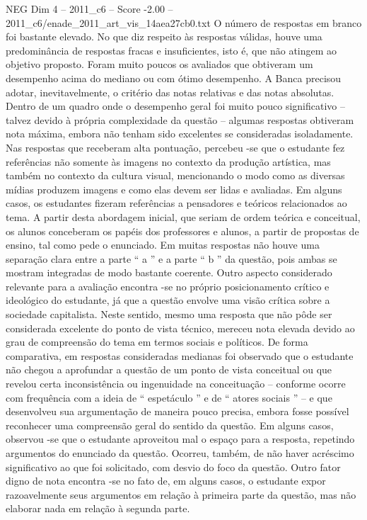 \begin{textsample}{NEG Dim 4 – 2011\_c6 – Score -2.00 – 2011\_c6/enade\_2011\_art\_vis\_14aea27cb0.txt}
O número de respostas em branco foi bastante elevado.
No que diz respeito às respostas válidas, houve uma predominância de respostas fracas e insuficientes, isto é, que não atingem ao objetivo proposto.
Foram muito poucos os avaliados que obtiveram um desempenho acima do mediano ou com ótimo desempenho.
A Banca precisou adotar, inevitavelmente, o critério das notas relativas e das notas absolutas.
Dentro de um quadro onde o desempenho geral foi muito pouco significativo – talvez devido à própria complexidade da questão – algumas respostas obtiveram nota máxima, embora não tenham sido excelentes se consideradas isoladamente.
Nas respostas que receberam alta pontuação, percebeu -se que o estudante fez referências não somente às imagens no contexto da produção artística, mas também no contexto da cultura visual, mencionando o modo como as diversas mídias produzem imagens e como elas devem ser lidas e avaliadas.
Em alguns casos, os estudantes fizeram referências a pensadores e teóricos relacionados ao tema.
A partir desta abordagem inicial, que seriam de ordem teórica e conceitual, os alunos conceberam os papéis dos professores e alunos, a partir de propostas de ensino, tal como pede o enunciado.
Em muitas respostas não houve uma separação clara entre a parte “ a ” e a parte “ b ” da questão, pois ambas se mostram integradas de modo bastante coerente.
Outro aspecto considerado relevante para a avaliação encontra -se no próprio posicionamento crítico e ideológico do estudante, já que a questão envolve uma visão crítica sobre a sociedade capitalista.
Neste sentido, mesmo uma resposta que não pôde ser considerada excelente do ponto de vista técnico, mereceu nota elevada devido ao grau de compreensão do tema em termos sociais e políticos.
De forma comparativa, em respostas consideradas medianas foi observado que o estudante não chegou a aprofundar a questão de um ponto de vista conceitual ou que revelou certa inconsistência ou ingenuidade na conceituação – conforme ocorre com frequência com a ideia de “ espetáculo ” e de “ atores sociais ” – e que desenvolveu sua argumentação de maneira pouco precisa, embora fosse possível reconhecer uma compreensão geral do sentido da questão.
Em alguns casos, observou -se que o estudante aproveitou mal o espaço para a resposta, repetindo argumentos do enunciado da questão.
Ocorreu, também, de não haver acréscimo significativo ao que foi solicitado, com desvio do foco da questão.
Outro fator digno de nota encontra -se no fato de, em alguns casos, o estudante expor razoavelmente seus argumentos em relação à primeira parte da questão, mas não elaborar nada em relação à segunda parte.

\end{textsample}
